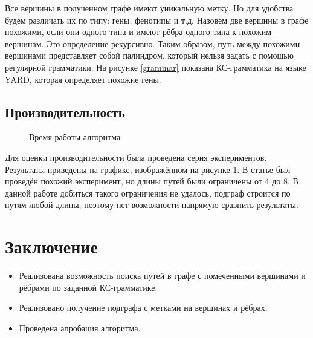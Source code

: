 \documentclass[14pt]{matmex-diploma}
\begin{document}
Все вершины в полученном графе имеют уникальную метку. Но для удобства будем различать их по типу: гены, фенотипы и т.д. Назовём две вершины в графе похожими, если они одного типа и имеют рёбра одного типа к похожим вершинам. Это определение рекурсивно. Таким образом, путь между похожими вершинами представляет собой палиндром, который нельзя задать с помощью регулярной грамматики. На рисунке \ref{grammar} показана КС-грамматика на языке YARD, которая определяет похожие гены.  
\subsection{Производительность}

\begin{figure}
\begin{center}
\end{center}
\caption{Время работы алгоритма}
\label{time}
\end{figure}

Для оценки производительности была проведена серия экспериментов. Результаты приведены на графике, изображённом на рисунке \ref{time}. В статье \cite{subgraph} был проведён похожий эксперимент, но длины путей были ограничены от 4 до 8. В данной работе добиться такого ограничения не удалось, подграф строится по путям любой длины, поэтому нет возможности напрямую сравнить результаты.

\section{Заключение}
\begin{itemize}
    \item Реализована возможность поиска путей в графе с помеченными вершинами и рёбрами по заданной КС-грамматике.
    \item Реализовано получение подграфа с метками на вершинах и рёбрах.
    \item Проведена апробация алгоритма.
    
\end{itemize}
\setmonofont[Mapping=tex-text]{CMU Typewriter Text}


\end{document}
